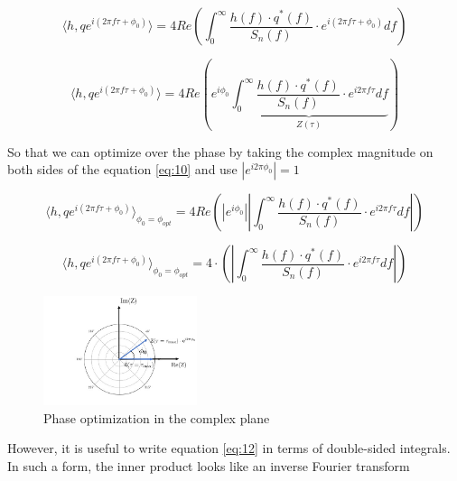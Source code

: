 \begin{equation}\label{eq:9}
\langle h,q e^{i(2\pi f \tau + \phi_0)} \rangle =4 Re\left( \int_{0}^{\infty} \frac{h(f) \cdot q^{*}(f) }{S_n(f)} \cdot e^{i(2\pi f \tau + \phi_0)} df \right)
\end{equation}

\begin{equation}\label{eq:10}
\langle h,q e^{i(2\pi f \tau + \phi_0)} \rangle =4 Re\left( e^{i \phi_0}\underbrace{\int_{0}^{\infty} \frac{h(f) \cdot q^{*}(f) }{S_n(f)} \cdot e^{i 2\pi f \tau} df}_{Z(\tau)} \right)
\end{equation}


So that we can optimize over the phase by taking the complex magnitude on both sides of the equation \ref{eq:10} and use $\left|e^{i2\pi \phi_0}\right|=1$

\begin{equation}\label{eq:11}
\langle h,q e^{i(2\pi f \tau + \phi_0)} \rangle_{\phi_0=\phi_{opt}} =4 Re\left( \left|e^{i \phi_0}\right|  \left| \int_{0}^{\infty} \frac{h(f) \cdot q^{*}(f) }{S_n(f)} \cdot e^{i 2\pi f \tau} df \right| \right)
\end{equation}

\begin{equation}\label{eq:12}
\langle h,q e^{i(2\pi f \tau + \phi_0)} \rangle_{\phi_0=\phi_{opt}} =4\cdot \left( \left| \int_{0}^{\infty} \frac{h(f) \cdot q^{*}(f) }{S_n(f)} \cdot e^{i 2\pi f \tau} df \right| \right)
\end{equation}

\begin{figure}[hbt!]

\begin{center}

\includegraphics[width=0.4\textwidth, angle=0]{images/ph_opt.png}
\caption{Phase optimization in the complex plane}
\label{fig:6}
\end{center}
\end{figure}

\FloatBarrier

However, it is useful to write equation \ref{eq:12} in terms of double-sided integrals. In such a form, the inner product looks like an inverse Fourier transform

